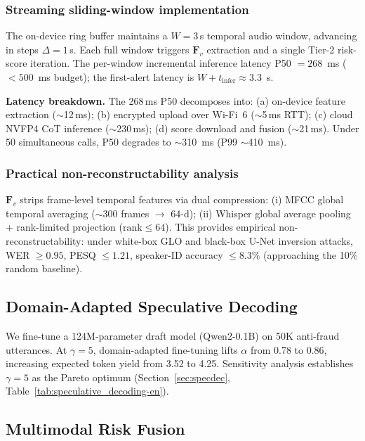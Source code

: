 \documentclass[final,5p,times,number]{elsarticle}
\begin{document}
\subsubsection{Streaming sliding-window implementation}\label{sec:streaming}

The on-device ring buffer maintains a $W = 3$\,s temporal audio window, advancing in steps $\Delta = 1$\,s. Each full window triggers $\bm{F}_v$ extraction and a single Tier-2 risk-score iteration. The per-window incremental inference latency P50 $=268$~ms ($<500$~ms budget); the first-alert latency is $W + t_{\mathrm{infer}}\approx 3.3$~s.

\medskip
\noindent\textbf{Latency breakdown.} The 268\,ms P50 decomposes into: (a) on-device feature extraction ($\sim$12\,ms); (b) encrypted upload over Wi-Fi~6 ($\sim$5\,ms RTT); (c) cloud NVFP4 CoT inference ($\sim$230\,ms); (d) score download and fusion ($\sim$21\,ms). Under 50 simultaneous calls, P50 degrades to $\sim$310~ms (P99 $\sim$410~ms).

\subsubsection{Practical non-reconstructability analysis}

$\bm{F}_v$ strips frame-level temporal features via dual compression: (i) MFCC global temporal averaging ($\sim$300 frames $\rightarrow$ 64-d); (ii) Whisper global average pooling + rank-limited projection ($\text{rank}\le 64$). This provides empirical non-reconstructability: under white-box GLO and black-box U-Net inversion attacks, WER $\ge 0.95$, PESQ $\le 1.21$, speaker-ID accuracy $\le 8.3\%$ (approaching the 10\% random baseline).

\subsection{Domain-Adapted Speculative Decoding}\label{sec:specdec-method}

We fine-tune a 124M-parameter draft model (Qwen2-0.1B) on 50K anti-fraud utterances. At $\gamma = 5$, domain-adapted fine-tuning lifts $\alpha$ from 0.78 to 0.86, increasing expected token yield from 3.52 to 4.25. Sensitivity analysis establishes $\gamma = 5$ as the Pareto optimum (Section~\ref{sec:specdec}, Table~\ref{tab:speculative_decoding-en}).

\subsection{Multimodal Risk Fusion}
\end{document}
